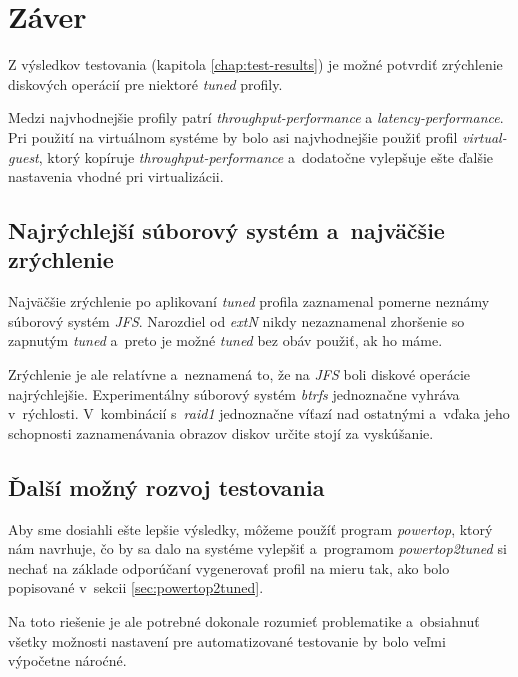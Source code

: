 %
%

\chapter{Záver}

Z výsledkov testovania (kapitola \ref{chap:test-results}) je možné potvrdiť
zrýchlenie diskových operácií pre niektoré \emph{tuned} profily. 

Medzi najvhodnejšie profily patrí \emph{throughput-performance} a
\emph{latency-performance}. Pri použití na virtuálnom systéme by bolo asi
najvhodnejšie použiť profil \emph{virtual-guest},  ktorý kopíruje
\emph{throughput-performance} a~dodatočne vylepšuje ešte ďalšie nastavenia
vhodné pri virtualizácii.

%
%

\section{Najrýchlejší súborový systém a~najväčšie zrýchlenie}

Najväčšie zrýchlenie po aplikovaní \emph{tuned} profila zaznamenal pomerne
neznámy súborový systém \emph{JFS}. Narozdiel od \emph{extN} nikdy nezaznamenal
zhoršenie so zapnutým \emph{tuned} a~preto je možné \emph{tuned} bez obáv
použiť, ak ho máme.

Zrýchlenie je ale relatívne a~neznamená to, že na \emph{JFS} boli diskové
operácie najrýchlejšie. Experimentálny súborový systém \emph{btrfs} jednoznačne
vyhráva v~rýchlosti. V~kombinácií s~\emph{raid1} jednoznačne víťazí nad
ostatnými a~vďaka jeho schopnosti zaznamenávania obrazov diskov určite stojí za
vyskúšanie.

\section{Ďalší možný rozvoj testovania}

Aby sme dosiahli ešte lepšie výsledky, môžeme použíť program \emph{powertop},
ktorý nám navrhuje, čo by sa dalo na systéme vylepšiť a~programom
\emph{powertop2tuned} si nechať na základe odporúčaní vygenerovať profil na
mieru tak, ako bolo popisované v~sekcii \ref{sec:powertop2tuned}.

Na toto riešenie je ale potrebné dokonale rozumieť problematike a~obsiahnuť
všetky možnosti nastavení pre automatizované testovanie by bolo veľmi výpočetne
nároćné.

